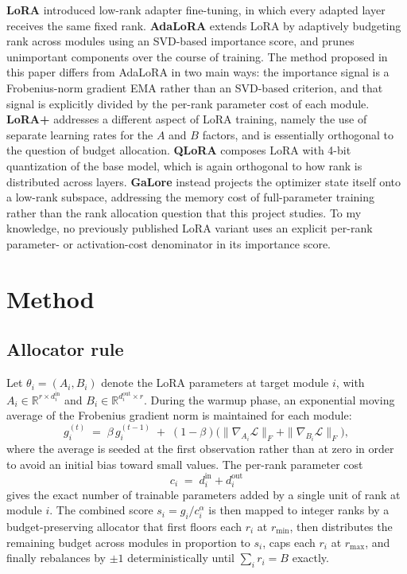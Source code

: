 \documentclass{article}
\begin{document}
\textbf{LoRA} \cite{hu2022lora} introduced low-rank adapter
fine-tuning, in which every adapted layer receives the same fixed
rank. \textbf{AdaLoRA} \cite{zhang2023adalora} extends LoRA by
adaptively budgeting rank across modules using an SVD-based importance
score, and prunes unimportant components over the course of training.
The method proposed in this paper differs from AdaLoRA in two main
ways: the importance signal is a Frobenius-norm gradient EMA rather
than an SVD-based criterion, and that signal is explicitly divided by
the per-rank parameter cost of each module. \textbf{LoRA+}
\cite{hayou2024loraplus} addresses a different aspect of LoRA training,
namely the use of separate learning rates for the $A$ and $B$ factors,
and is essentially orthogonal to the question of budget allocation.
\textbf{QLoRA} \cite{dettmers2023qlora} composes LoRA with 4-bit
quantization of the base model, which is again orthogonal to how rank
is distributed across layers. \textbf{GaLore} \cite{zhao2024galore}
instead projects the optimizer state itself onto a low-rank subspace,
addressing the memory cost of full-parameter training rather than the
rank allocation question that this project studies. To my knowledge,
no previously published LoRA variant uses an explicit per-rank
parameter- or activation-cost denominator in its importance score.

\section{Method}
\label{sec:method}

\subsection{Allocator rule}
\label{sec:method-rule}

Let $\theta_i = (A_i, B_i)$ denote the LoRA parameters at target module
$i$, with $A_i \in \mathbb{R}^{r \times d_i^{\text{in}}}$ and
$B_i \in \mathbb{R}^{d_i^{\text{out}} \times r}$. During the warmup
phase, an exponential moving average of the Frobenius gradient norm is
maintained for each module:
\begin{equation}
g_i^{(t)} \;=\; \beta\, g_i^{(t-1)} \;+\; (1-\beta)
   \bigl(\|\nabla_{A_i} \mathcal{L}\|_F + \|\nabla_{B_i} \mathcal{L}\|_F\bigr),
\end{equation}
where the average is seeded at the first observation rather than at
zero in order to avoid an initial bias toward small values. The
per-rank parameter cost
\begin{equation}
c_i \;=\; d_i^{\text{in}} + d_i^{\text{out}}
\end{equation}
gives the exact number of trainable parameters added by a single unit
of rank at module $i$. The combined score $s_i = g_i / c_i^{\alpha}$
is then mapped to integer ranks by a budget-preserving allocator that
first floors each $r_i$ at $r_{\min}$, then distributes the remaining
budget across modules in proportion to $s_i$, caps each $r_i$ at
$r_{\max}$, and finally rebalances by $\pm 1$ deterministically until
$\sum_i r_i = B$ exactly.
\end{document}
